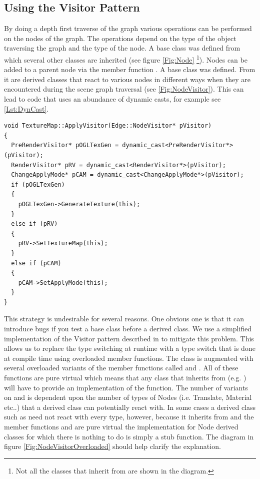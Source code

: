 \subsection{Using the Visitor Pattern}
By doing a depth first traverse of the graph various operations can be
performed on the nodes of the graph. The operations depend on the type of the
object traversing the graph and the type of the node. A base class
 was defined from which several other classes are inherited
(see figure \ref{Fig:Node} \footnote{Not all the classes that inherit from
 are shown in the diagram.}). Nodes can be added to a parent
node via the member function . A base class
 was defined. From it are derived classes that react to
various nodes in different ways when they are encountered during the scene graph
traversal (see \ref{Fig:NodeVisitor}). This can lead to code that uses an
abundance of dynamic casts, for example see \ref{Lst:DynCast}.


\lstset{language=C++}
\begin{lstlisting}[basicstyle={\ttfamily \footnotesize},caption={Dynamic casting example},label={Lst:DynCast}]
void TextureMap::ApplyVisitor(Edge::NodeVisitor* pVisitor)
{
  PreRenderVisitor* pOGLTexGen = dynamic_cast<PreRenderVisitor*>(pVisitor);
  RenderVisitor* pRV = dynamic_cast<RenderVisitor*>(pVisitor);
  ChangeApplyMode* pCAM = dynamic_cast<ChangeApplyMode*>(pVisitor);	
  if (pOGLTexGen)
  {	
    pOGLTexGen->GenerateTexture(this);
  }
  else if (pRV)
  {
    pRV->SetTextureMap(this);
  }
  else if (pCAM)
  {
    pCAM->SetApplyMode(this);
  }
}
\end{lstlisting}

This strategy is undesirable for several reasons. One obvious one is that it
can introduce bugs if you test a base class before a derived class. We use a
simplified implementation of the Visitor pattern described in
\cite{Alexandrescu} to mitigate this problem. This allows us to replace the type
switching at runtime with a type switch that is done at compile time using
overloaded member functions. The class  is augmented
with several overloaded variants of the member functions called
 and . All of these functions are pure
virtual which means that any class that inherits from 
(e.g. ) will have to provide an implementation of the
function. The number of variants on  and  is
dependent upon the number of types of Nodes (i.e. Translate, Material etc..)
that a  derived class can potentially react with. In
some cases a  derived class such as
 need not react with every  type,
however, because it inherits from  and the member
functions  and 
are pure virtual the implementation for Node derived classes for which there is
nothing to do is simply a stub function. The diagram in figure
\ref{Fig:NodeVisitorOverloaded} should help clarify the explanation.


